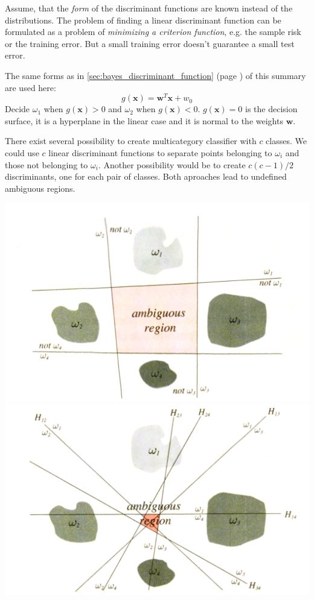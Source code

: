   Assume, that the \emph{form} of the discriminant functions are known instead of the
  distributions. The problem of finding a linear discriminant function can be formulated as a problem
  of \emph{minimizing a criterion function}, e.g. the sample risk or the training error.
  But a small training error doesn't guarantee a small test error.
  

      The same forms as in \ref{sec:bayes_discriminant_function} (page \pageref{sec:bayes_discriminant_function}) 
      of this summary are used here:
      $$g(\bm x) = \bm w ^T \bm x + w_0$$
      Decide $\omega_1$ when $g(\bm x) > 0$ and $\omega_2$ when $g(\bm x) < 0$. $g(\bm x) = 0$ is
      the decision surface, it is a hyperplane in the linear case and it is normal to the weights 
      $\bm w$.
      
    \begin{multicols}{2}
		There exist several possibility to create multicategory classifier with $c$ classes.
		We could use $c$ linear discriminant functions to separate points belonging 
		to $\omega_i$ and those not belonging to $\omega_i$.
		Another possibility would be to create $c(c-1)/2$ discriminants, one for each pair of classes.
		Both aproaches lead to undefined ambiguous regions.
	
		\includegraphics[width=0.5\linewidth]{images/onevsall.jpg}
		\includegraphics[width=0.5\linewidth]{images/onevsone.jpg}
    \end{multicols}
    

